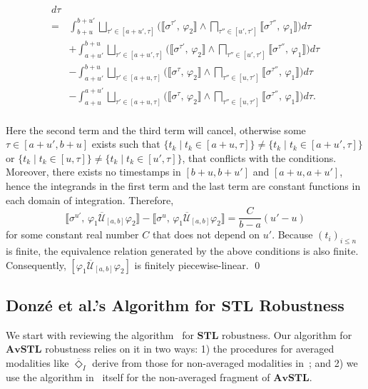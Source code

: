 \documentclass[envcountsect,orivec]{llncs} \usepackage{etex} \usepackage[]{graphicx}
\def\myqed{\qed}
\newcommand{\STL}{\textbf{STL}}
\newcommand{\TUntil}[1]{\mathbin{\overline{\mathcal{U}}_{#1}}}
\newcommand{\TDiaOp}[1]{\overline{\Diamond}_{#1}}
\newcommand{\Robust}[2]{{ \llbracket #1,\, #2 \rrbracket}}
\newcommand{\Vee}[1]{{{\bigsqcup_{#1}}}}
\newcommand{\Wedge}[1]{{{\bigsqcap_{#1}}}}
\newcommand{\Frac}[2]{{\displaystyle{\frac{#1}{#2}}}}
\newcommand{\Int}{\displaystyle \int}
\newcommand{\AvSTL}{\textbf{AvSTL}}
\begin{document}
{\begin{myproof}
\begin{align*}
      d\tau\\
      =&
      \Int_{b+u}^{b+u'} 
      \Vee{\tau' \in [a+u', \tau] }
      \Big( \Robust{\sigma^{\tau'}}{\varphi_2} \wedge \Wedge{\tau'' \in [u', \tau']} \Robust{\sigma^{\tau''}}{\varphi_1} \Big) 
      d\tau \\
      &+\Int_{a+u'}^{b+u} 
      \Vee{\tau' \in [a+u', \tau] }
      \Big( \Robust{\sigma^{\tau'}}{\varphi_2} \wedge \Wedge{\tau'' \in [u', \tau']} \Robust{\sigma^{\tau''}}{\varphi_1} \Big) 
      d\tau \\
      &- \Int_{a+u'}^{b+u} 
      \Vee{\tau' \in [a+u, \tau] }
      \Big( \Robust{\sigma^{\tau}}{\varphi_2} \wedge \Wedge{\tau'' \in [u, \tau']} \Robust{\sigma^{\tau''}}{\varphi_1} \Big) 
      d\tau\\
      &- \Int_{a+u}^{a+u'} 
      \Vee{\tau' \in [a+u, \tau] }
      \Big( \Robust{\sigma^{\tau}}{\varphi_2} \wedge \Wedge{\tau'' \in [u, \tau']} \Robust{\sigma^{\tau''}}{\varphi_1} \Big) 
      d\tau.\\
    \end{align*}

  Here the second term and the third term will cancel, 
  otherwise some $\tau \in [a+u', b+u]$ exists such that 
  $\{ t_k \mid t_k \in [a+u, \tau]\} \neq \{ t_k \mid t_k \in [a+u', \tau]\}$
  or
  $\{ t_k \mid t_k \in [u, \tau]\} \neq \{ t_k \mid t_k \in [u', \tau]\}$,
  that conflicts with the conditions.
  Moreover,
  there exists no timestamps in $[b+u, b+u']$ and $[a+u, a+u']$,
  hence the integrands in the first term and the last term are
  constant functions in each domain of integration.
  Therefore,
  \[
    \Robust{\sigma^{u'}}{\varphi_1 \TUntil{[a,b]} \varphi_2} 
    - \Robust{\sigma^u}{\varphi_1 \TUntil{[a,b]} \varphi_2}
    = \Frac{C}{b-a} (u' - u)
  \]
  for some constant real number $C$ that does not depend on $u'$.
  Because $(t_i)_{i \leq n}$ is finite,
  the equivalence relation generated by the above conditions
  is also finite.
  Consequently, $[\varphi_1 \TUntil{[a,b]} \varphi_2]$ is finitely piecewise-linear.
  \myqed
\end{myproof}
}








\subsection{Donz\'e et al.'s Algorithm for $\STL$ Robustness}
\label{subsec:algoSTL}
We start with reviewing the algorithm~\cite{DBLP:conf/cav/DonzeFM13} for
$\STL$ robustness. 
Our algorithm for $\AvSTL$ robustness relies on it in two ways: 1)
the procedures for averaged modalities like $\TDiaOp{I}$ derive from those for non-averaged
modalities
in~\cite{DBLP:conf/cav/DonzeFM13}; and 2) we  use the algorithm
in~\cite{DBLP:conf/cav/DonzeFM13} itself for the non-averaged fragment of
$\AvSTL$. 
\end{document}
